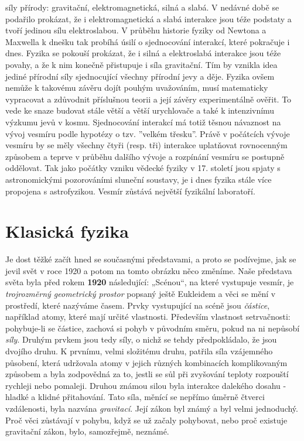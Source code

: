     síly přírody: gravitační, elektromagnetická, silná a slabá. V nedávné době se podařilo prokázat,
    že i elektromagnetická a slabá interakce jsou téže podstaty a tvoří jedinou sílu elektroslabou.
    V průběhu historie fyziky od Newtona a Maxwella k dnešku tak probíhá úsilí o sjednocování
    interakcí, které pokračuje i dnes. Fyzika se pokouší prokázat, že i silná a elektroslabá
    interakce jsou téže povahy, a že k nim konečně přistupuje i síla gravitační. Tím by vznikla idea
    jediné přírodní síly sjednocující všechny přírodní jevy a děje. Fyzika ovšem nemůže k takovému
    závěru dojít pouhým uvažováním, musí matematicky vypracovat a zdůvodnit příslušnou teorii a její
    závěry experimentálně ověřit. To vede ke snaze budovat stále větší a větší urychlovače a také k
    intenzivnímu výzkumu jevů v kosmu. Sjednocování interakcí má totiž těsnou návaznost na vývoj
    vesmíru podle hypotézy o tzv. ”velkém třesku”. Právě v počátcích vývoje vesmíru by se měly
    všechny čtyři (resp. tři) interakce uplatňovat rovnocenným způsobem a teprve v průběhu dalšího
    vývoje a rozpínání vesmíru se postupně oddělovat. Tak jako počátky vzniku vědecké fyziky v 17.
    století jsou spjaty s astronomickými pozorováními sluneční soustavy, je i dnes fyzika stále více
    propojena s astrofyzikou. Vesmír zůstává největší fyzikální laboratoří.

  \section{Klasická fyzika}\label{fyz:IchapIIsecIV}
    Je dost těžké začít hned se současnými představami, a proto se podívejme, jak se jevil svět v
    roce 1920 a potom na tomto obrázku něco změníme. Naše představa světa byla před rokem
    \textbf{1920} následující: „Scénou“, na které vystupuje vesmír, je \emph{trojrozměrný
    geometrický prostor} popsaný ještě Eukleidem a věci se mění v prostředí, které nazýváme časem.
    Prvky vystupující na scéně jsou \emph{částice}, například atomy, které mají určité vlastnosti.
    Především vlastnost setrvačnosti: pohybuje-li se částice, zachová si pohyb v původním směru,
    pokud na ni nepůsobí \emph{síly}. Druhým prvkem jsou tedy síly, o nichž se tehdy  
    předpokládalo, že jsou dvojího druhu. K prvnímu, velmi složitému druhu, patřila síla vzájemného
    působení, která udržovala atomy v jejich různých kombinacích komplikovaným způsobem a byla
    zodpovědná za to, jestli se sůl při zvyšování teploty rozpouští rychleji nebo pomaleji. Druhou
    známou silou byla interakce dalekého dosahu - hladké a klidné přitahování. Tato síla, měnící se
    nepřímo úměrně čtverci vzdálenosti, byla nazvána \emph{gravitací}. Její zákon byl známý a byl
    velmi jednoduchý. Proč věci zůstávají v pohybu, když se už začaly pohybovat, nebo proč existuje
    gravitační zákon, bylo, samozřejmě, neznámé.
    
